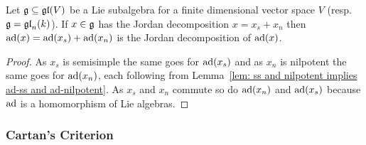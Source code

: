 \begin{cor}\label{cor: concrete Jordan decomposition compatible with adjoint representation}
 Let $\mathfrak{g} \subseteq \mathfrak{gl}(V)$ be a Lie subalgebra for a finite dimensional vector space $V$ (resp.\ $\mathfrak{g} = \mathfrak{gl}_n(k)$). If $x \in \mathfrak{g}$ has the Jordan decomposition $x = x_s + x_n$ then $\operatorname{ad}(x) = \operatorname{ad}(x_s) + \operatorname{ad}(x_n)$ is the Jordan decomposition of $\operatorname{ad}(x)$.
\end{cor}
\begin{proof}
 As $x_s$ is semisimple the same goes for $\operatorname{ad}(x_s)$ and as $x_n$ is nilpotent the same goes for $\operatorname{ad}(x_n)$, each following from Lemma~\ref{lem: ss and nilpotent implies ad-ss and ad-nilpotent}. As $x_s$ and $x_n$ commute so do $\operatorname{ad}(x_n)$ and $\operatorname{ad}(x_s)$ because $\operatorname{ad}$ is a homomorphism of Lie algebras.
\end{proof}





\subsubsection{Cartan’s Criterion}


